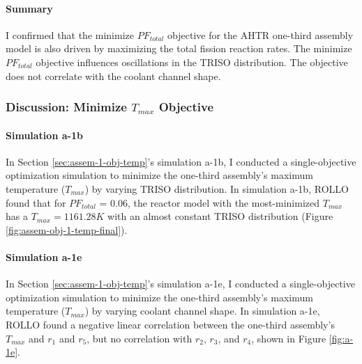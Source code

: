\paragraph{Summary}
I confirmed that the minimize $PF_{total}$ objective for the \gls{AHTR} one-third 
assembly model is also driven by maximizing the total fission reaction rates. 
The minimize $PF_{total}$ objective influences oscillations in the TRISO distribution.
The objective does not correlate with the coolant channel shape.

\subsubsection{Discussion: Minimize $T_{max}$ Objective}
\paragraph{Simulation a-1b}
In Section \ref{sec:assem-1-obj-temp}'s simulation a-1b, I conducted a single-objective 
optimization simulation to minimize the one-third assembly's maximum temperature 
($T_{max}$) by varying TRISO distribution. 
In simulation a-1b, \gls{ROLLO} found that for $PF_{total}$ = 0.06, the reactor model 
with the most-minimized $T_{max}$ has a $T_{max} = 1161.28K$ with an almost constant 
TRISO distribution (Figure \ref{fig:assem-obj-1-temp-final}). 

\paragraph{Simulation a-1e}
In Section \ref{sec:assem-1-obj-temp}'s simulation a-1e, I conducted a single-objective 
optimization simulation to minimize the one-third assembly's maximum temperature 
($T_{max}$) by varying coolant channel shape. 
In simulation a-1e, \gls{ROLLO} found a negative linear correlation 
between the one-third assembly's $T_{max}$ and $r_1$ and $r_5$, but no correlation with 
$r_2$, $r_3$, and $r_4$, shown in Figure \ref{fig:a-1e}. 


